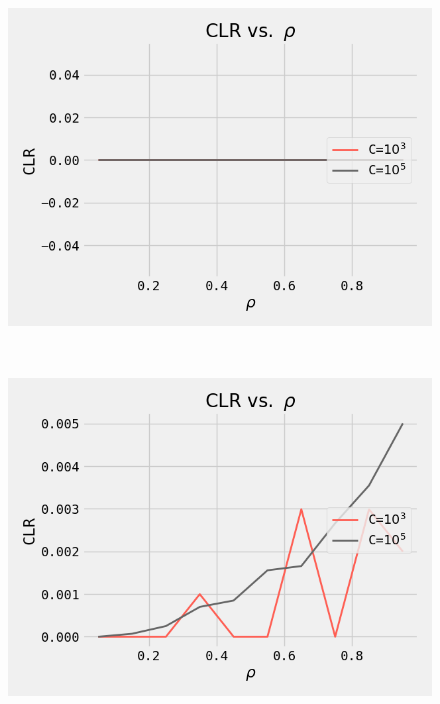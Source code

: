 \begin{figure}[ht!]
 \centering
 \captionsetup{justification=centering}
 \begin{minipage}[]{0.48\linewidth}
  \centering
 \includegraphics[width=\linewidth]{Figures/task1_1.png}
 \label{fig1} 
 \end{minipage}~~~~\begin{minipage}  []{0.48\linewidth}
  \centering
  \includegraphics[width=\linewidth]{Figures/task1_2.png}
  \label{fig2}
 \end{minipage}
\end{figure}
